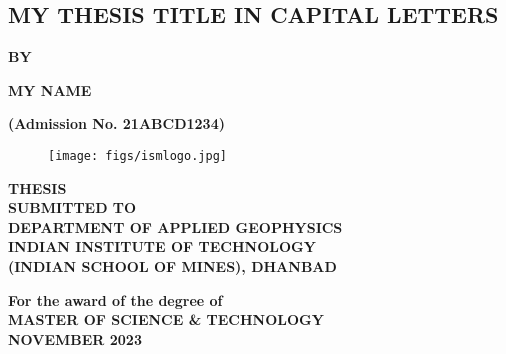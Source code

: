 \documentclass[12pt]{report}
\begin{document}
\begin{titlepage}
\begin{center}
   \section*{\fontsize{24}{24}\selectfont MY THESIS TITLE IN CAPITAL LETTERS}
   

\textbf{BY}

\textbf{\fontsize{14}{16}\selectfont MY NAME}

\textbf{\fontsize{14}{16}\selectfont (Admission No. 21ABCD1234)}


\begin{figure}[H]
    \centering
    \texttt{[image: figs/ismlogo.jpg]}
   
    \label{fig:enter-labe2l}
\end{figure}

\textbf{\fontsize{14}{16}\selectfont THESIS\\ SUBMITTED TO\\
DEPARTMENT OF APPLIED GEOPHYSICS\\
INDIAN INSTITUTE OF TECHNOLOGY\\
(INDIAN SCHOOL OF MINES), DHANBAD\\}


\vspace{1cm}

\textbf{\fontsize{14}{16}\selectfont For the award of the degree of\\
MASTER OF SCIENCE \& TECHNOLOGY\\   %
NOVEMBER 2023}

\end{center}

\end{titlepage}
\restoregeometry %


\newpage
\clearpage 
\setcounter{page}{1}  %

\end{document}
